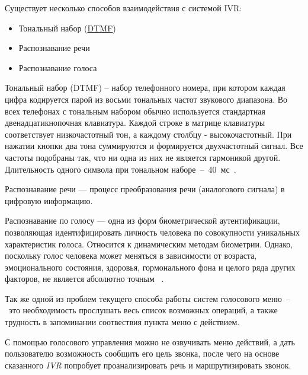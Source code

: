 Существует несколько способов взаимодействия с системой IVR:
\begin{itemize}
    \item Тональный набор (\hyperlink{dtmf}{DTMF})
    \item Распознавание речи
    \item Распознавание голоса
\end{itemize}

Тональный набор (DTMF) -- набор телефонного номера, при котором каждая цифра кодируется
парой из восьми тональных частот звукового диапазона. Во всех телефонах с
тональным набором обычно используется стандартная двенадцатикнопочная клавиатура.
Каждой строке в матрице клавиатуры соответствует низкочастотный тон, а каждому
столбцу - высокочастотный. При нажатии кнопки два тона суммируются и формируется
двухчастотный сигнал. Все частоты подобраны так, что ни одна из них не является
гармоникой другой. Длительность одного символа при тональном наборе~--~40~мс~\cite{dtmf}.

Распознавание речи — процесс преобразования речи (аналогового сигнала) в цифровую информацию.

Распознавание по голосу — одна из форм биометрической аутентификации, позволяющая
идентифицировать личность человека по совокупности уникальных характеристик голоса.
Относится к динамическим методам биометрии. Однако, поскольку голос человека может
меняться в зависимости от возраста, эмоционального состояния, здоровья,
гормонального фона и целого ряда других факторов, не является абсолютно точным~
\cite{recognize_voice}.

Так же одной из проблем текущего способа работы систем голосового меню~--~это
необходимость прослушать весь список возможных операций, а также трудность в
запоминании соотвествия пункта меню с действием.

С помощью голосового управления можно не озвучивать меню действий, а дать
пользователю возможность сообщить его цель звонка, после чего на основе
сказанного \textit{IVR} попробует проанализировать речь и маршрутизировать звонок.

